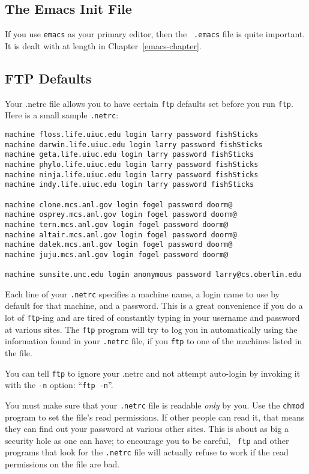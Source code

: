 \subsection{The Emacs Init File}
        If you use {\tt emacs} as your primary editor, then the {\tt
.emacs} file is quite important.  It is dealt with at length in
Chapter~\ref{emacs-chapter}.

\subsection{FTP Defaults}
        Your .netrc file allows you to have certain {\tt ftp} defaults
set before you run {\tt ftp}.  Here is a small sample {\tt .netrc}:

  \begin{screen}
    \begin{verbatim}
machine floss.life.uiuc.edu login larry password fishSticks
machine darwin.life.uiuc.edu login larry password fishSticks
machine geta.life.uiuc.edu login larry password fishSticks
machine phylo.life.uiuc.edu login larry password fishSticks
machine ninja.life.uiuc.edu login larry password fishSticks
machine indy.life.uiuc.edu login larry password fishSticks

machine clone.mcs.anl.gov login fogel password doorm@
machine osprey.mcs.anl.gov login fogel password doorm@
machine tern.mcs.anl.gov login fogel password doorm@
machine altair.mcs.anl.gov login fogel password doorm@
machine dalek.mcs.anl.gov login fogel password doorm@
machine juju.mcs.anl.gov login fogel password doorm@

machine sunsite.unc.edu login anonymous password larry@cs.oberlin.edu
    \end{verbatim}
  \end{screen}

        Each line of your {\tt .netrc} specifies a machine name, a
login name to use by default for that machine, and a password.  This
is a great convenience if you do a lot of {\tt ftp}-ing and are tired
of constantly typing in your username and password at various sites.
The {\tt ftp} program will try to log you in automatically using the
information found in your {\tt .netrc} file, if you {\tt ftp} to one
of the machines listed in the file.

        You can tell {\tt ftp} to ignore your .netrc and not attempt
auto-login by invoking it with the {\tt -n} option: ``{\tt ftp~-n}''.

        You must make sure that your {\tt .netrc} file is readable
{\em only} by you.  Use the {\tt chmod} program to set the file's read
permissions.  If other people can read it, that means they can find
out your password at various other sites.  This is about as big a
security hole as one can have; to encourage you to be careful, {\tt
ftp} and other programs that look for the {\tt .netrc} file will
actually refuse to work if the read permissions on the file are bad.

